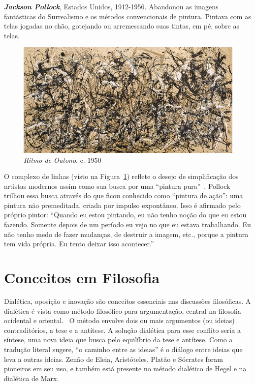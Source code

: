 \textbf{\emph{Jackson Pollock}}, Estados Unidos, 1912-1956. Abandonou as imagens
fantásticas do Surrealismo e os métodos convencionais de pintura. Pintava com as
telas jogadas no chão, gotejando ou arremessando suas tintas, em pé, sobre as
telas. 

\begin{figure}[h!]
  \begin{center}
    \includegraphics{figs/pollock_ritmo.png}
  \end{center}
  \caption{\emph{Ritmo de Outono}, c. 1950}
  \label{fig:pollock:ritmo}
\end{figure}

O complexo de linhas (visto na Figura~\ref{fig:pollock:ritmo}) reflete o desejo
de simplificação dos artistas modernos assim como sua busca por uma ``pintura
pura''~\cite{gombrich}. Pollock trilhou essa busca através do que ficou
conhecido como ``pintura de ação'': uma pintura não premeditada, criada por
impulso expontâneo. Isso é afirmado pelo próprio pintor: ``Quando eu estou
pintando, eu não tenho noção do que eu estou fazendo. Somente depois de um
período eu vejo no que eu estava trabalhando. Eu não tenho medo de fazer
mudanças, de destruir a imagem, etc., porque a pintura tem vida própria. Eu
tento deixar isso acontecer.''~\cite{pollock}

\section{Conceitos em Filosofia}
\label{sec:fund:filosofia}

Dialética, oposição e inovação são conceitos essenciais nas discussões
filosóficas. A dialética é vista como método filosófico para argumentação,
central na filosofia ocidental e oriental.~\cite{deleuze,pinto,van} O método envolve dois ou mais
argumentos (ou ideias) contraditórios, a tese e a antítese. A solução dialética
para esse conflito seria a síntese, uma nova ideia que busca pelo equilíbrio da
tese e antítese. Como a tradução literal sugere, ``o caminho entre as ideias'' é
o diálogo entre ideias que leva a outras ideias. Zenão de Eleia, Aristóteles,
Platão e Sócrates foram pioneiros em seu uso, e também está presente no método
dialético de Hegel e na dialética de Marx.~\cite{dialectics}


